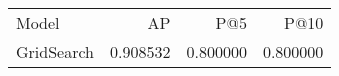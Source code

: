 \begin{tabular}{lrrr}
Model & AP & P@5 & P@10 \\
GridSearch & 0.908532 & 0.800000 & 0.800000 \\
\end{tabular}
